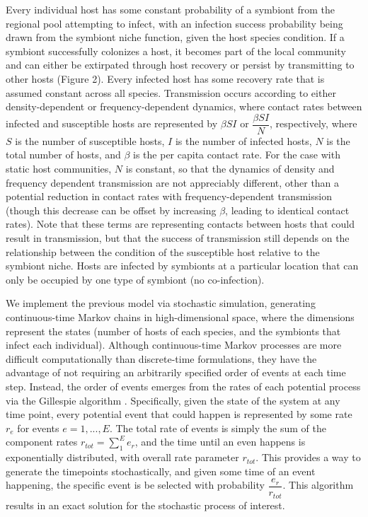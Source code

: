\documentclass[12pt]{article}
\begin{document}
Every individual host has some constant probability of a symbiont from the regional pool attempting to infect, with an infection success probability being drawn from the symbiont niche function, given the host species condition. 
If a symbiont successfully colonizes a host, it becomes part of the local community and can either be extirpated through host recovery or persist by transmitting to other hosts (Figure 2). 
Every infected host has some recovery rate that is assumed constant across all species. 
Transmission occurs according to either density-dependent or frequency-dependent dynamics, where contact rates between infected and susceptible hosts are represented by $\beta S I$ or $\dfrac{\beta S I}{N}$, respectively, where $S$ is the number of susceptible hosts, $I$ is the number of infected hosts, $N$ is the total number of hosts, and $\beta$ is the per capita contact rate. 
For the case with static host communities, $N$ is constant, so that the dynamics of density and frequency dependent transmission are not appreciably different, other than a potential reduction in contact rates with frequency-dependent transmission (though this decrease can be offset by increasing $\beta$, leading to identical contact rates). 
Note that these terms are representing contacts between hosts that could result in transmission, but that the success of transmission still depends on the relationship between the condition of the susceptible host relative to the symbiont niche. 
Hosts are infected by symbionts at a particular location that can only be occupied by one type of symbiont (no co-infection). 

We implement the previous model via stochastic simulation, generating continuous-time Markov chains in high-dimensional space, where the dimensions represent the states (number of hosts of each species, and the symbionts that infect each individual). 
Although continuous-time Markov processes are more difficult computationally than discrete-time formulations, they have the advantage of not requiring an arbitrarily specified order of events at each time step. 
Instead, the order of events emerges from the rates of each potential process via the Gillespie algorithm \citep{Gillespie1976}. 
Specifically, given the state of the system at any time point, every potential event that could happen is represented by some rate $r_e$ for events $e = 1, ..., E$. 
The total rate of events is simply the sum of the component rates $r_{tot} = \sum_{1}^{E} e_r$, and the time until an even happens is exponentially distributed, with overall rate parameter $r_{tot}$. 
This provides a way to generate the timepoints stochastically, and given some time of an event happening, the specific event is be selected with probability $\dfrac{e_r}{r_{tot}}$. 
This algorithm results in an exact solution for the stochastic process of interest. 
\end{document}
